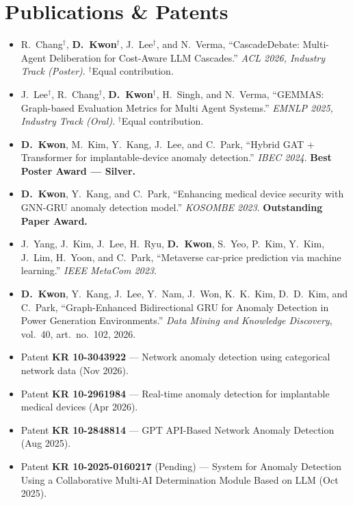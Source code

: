 \documentclass[letterpaper,11pt]{article}
\newcommand{\resumeSubHeadingListStart}{\begin{itemize}[leftmargin=0.15in, label={}]}
\newcommand{\resumeSubHeadingListEnd}{\end{itemize}}
\begin{document}
\section{Publications \& Patents}
  \resumeSubHeadingListStart
    \item\small{
      R.~Chang$^{\dagger}$, \textbf{D.~Kwon}$^{\dagger}$, J.~Lee$^{\dagger}$, and N.~Verma, ``CascadeDebate: Multi-Agent Deliberation for Cost-Aware LLM Cascades.'' \textit{ACL 2026, Industry Track (Poster)}. $^{\dagger}$Equal contribution.    }
    \item\small{
      J.~Lee$^{\dagger}$, R.~Chang$^{\dagger}$, \textbf{D.~Kwon}$^{\dagger}$, H.~Singh, and N.~Verma, ``GEMMAS: Graph-based Evaluation Metrics for Multi Agent Systems.'' \textit{EMNLP 2025, Industry Track (Oral)}. $^{\dagger}$Equal contribution.    }
    \item\small{
      \textbf{D.~Kwon}, M.~Kim, Y.~Kang, J.~Lee, and C.~Park, ``Hybrid GAT + Transformer for implantable-device anomaly detection.'' \textit{IBEC 2024}. \textbf{Best Poster Award --- Silver.}    }
    \item\small{
      \textbf{D.~Kwon}, Y.~Kang, and C.~Park, ``Enhancing medical device security with GNN-GRU anomaly detection model.'' \textit{KOSOMBE 2023}. \textbf{Outstanding Paper Award.}    }
    \item\small{
      J.~Yang, J.~Kim, J.~Lee, H.~Ryu, \textbf{D.~Kwon}, S.~Yeo, P.~Kim, Y.~Kim, J.~Lim, H.~Yoon, and C.~Park, ``Metaverse car-price prediction via machine learning.'' \textit{IEEE MetaCom 2023}.    }
    \item\small{
      \textbf{D.~Kwon}, Y.~Kang, J.~Lee, Y.~Nam, J.~Won, K.~K.~Kim, D.~D.~Kim, and C.~Park, ``Graph-Enhanced Bidirectional GRU for Anomaly Detection in Power Generation Environments.'' \textit{Data Mining and Knowledge Discovery}, vol.~40, art.~no.~102, 2026.
    }
    \item\small{
      Patent \textbf{KR 10-3043922} --- Network anomaly detection using categorical network data (Nov 2026).
    }
    \item\small{
      Patent \textbf{KR 10-2961984} --- Real-time anomaly detection for implantable medical devices (Apr 2026).
    }
    \item\small{
      Patent \textbf{KR 10-2848814} --- GPT API-Based Network Anomaly Detection (Aug 2025).
    }
    \item\small{
      Patent \textbf{KR 10-2025-0160217} (Pending) --- System for Anomaly Detection Using a Collaborative Multi-AI Determination Module Based on LLM (Oct 2025).
    }
  \resumeSubHeadingListEnd
\end{document}
